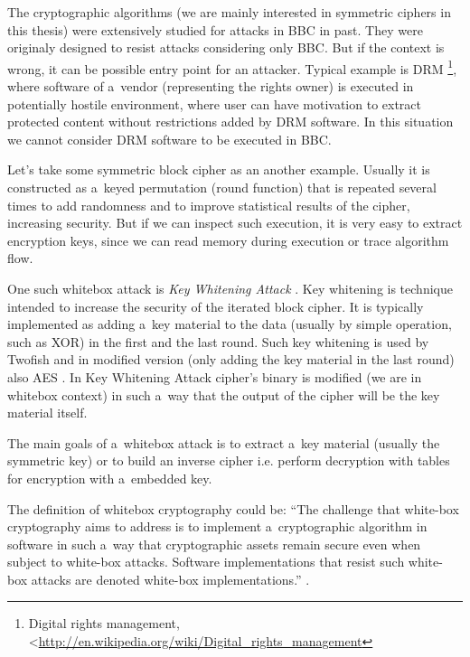 \documentclass[11pt,oneside,final]{fithesis2}
\begin{document}
    The cryptographic algorithms (we are mainly interested in symmetric ciphers in this thesis) were extensively studied for attacks in BBC in past.
    They were originaly designed to resist attacks considering only BBC. But if the context is wrong, it can be possible entry point for an attacker.
    Typical example is DRM \footnote{Digital rights management, \textless\url{http://en.wikipedia.org/wiki/Digital_rights_management}}, where software of a~vendor
    (representing the rights owner) is executed in potentially hostile environment, where user can have motivation to extract protected content without
    restrictions added by DRM software. In this situation we cannot consider DRM software to be executed in BBC.
    
    Let's take some symmetric block cipher as an another example. Usually it is constructed as a~keyed permutation (round function) that is repeated 
    several times to add randomness and to improve statistical results of the cipher, increasing security. But if we can inspect such execution, it is 
    very easy to extract encryption keys, since we can read memory during execution or trace algorithm flow.
    
    One such whitebox attack is \emph{Key Whitening Attack} \cite{Kerins06acautionary}. Key whitening is technique intended to increase the security of the iterated block cipher.
    It is typically implemented as adding a~key material to the data (usually by simple operation, such as XOR) in the first and the last round. Such key whitening 
    is used by Twofish \citep{Schneier98twofish:a} and in modified version (only adding the key material in the last round) also AES \citep{2002-daemen}. In Key Whitening Attack
    cipher's binary is modified (we are in whitebox context) in such a~way that the output of the cipher will be the key material itself. 
    
    The main goals of a~whitebox attack is to extract a~key material (usually the symmetric key) or to build an inverse cipher i.e. perform decryption 
    with tables for encryption with a~embedded key.
    
    The definition of whitebox cryptography could be:
    ``The challenge that white-box cryptography aims to address is to implement a~cryptographic algorithm in 
    software in such a~way that cryptographic assets remain secure even when subject to white-box attacks.
    Software implementations that resist such white-box attacks are denoted white-box implementations.'' \cite{hiding_keys}.
    
\end{document}
